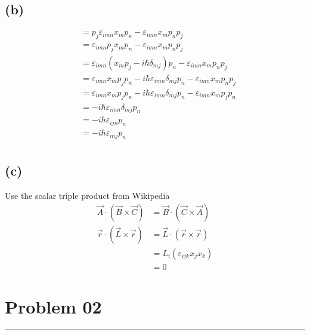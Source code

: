\documentclass[letter, 10pts]{article}
\newcommand{\hb}{\hbar}
\begin{document}
\subsection*{(b)}
\begin{align*}
	[p_j, L_i] &= p_j \varepsilon_{imn}x_m p_n - \varepsilon_{imn}x_m p_n p_j \\
&=  \varepsilon_{imn} p_j x_m p_n - \varepsilon_{imn}x_m p_n p_j \\
&=  \varepsilon_{imn} (x_m p_j - i \hb \delta_{mj} ) p_n - \varepsilon_{imn}x_m p_n p_j \\
&=  \varepsilon_{imn} x_m p_j p_n  - i \hb \varepsilon_{imn} \delta_{mj}  p_n - \varepsilon_{imn}x_m p_n p_j \\
&=  \varepsilon_{imn} x_m p_j p_n  - i \hb \varepsilon_{imn} \delta_{mj}  p_n - \varepsilon_{imn}x_m p_j p_n \\
&= - i \hb \varepsilon_{imn} \delta_{mj} p_n  \\
&= - i \hb \varepsilon_{ijn} p_n  \\
&= - i \hb \varepsilon_{n i j } p_n  \\
\end{align*}



\subsection*{(c)} 
Use the scalar triple product from Wikipedia
\begin{align*}
\vec{A} \cdot  (\vec{B} \times  \vec{C}) &= \vec{B} \cdot (\vec{C} \times  \vec{A}) \\
\vec{r} \cdot  (\vec{L} \times \vec{r}) &= 
\vec{L}\cdot  (\vec{r} \times  \vec{r}) \\ 
					&= L_i \left( \varepsilon_{ijk} x_j x_k\right) \\ 
					&= 0 
\end{align*}





\section*{Problem 02}
\hrule 
\end{document}
